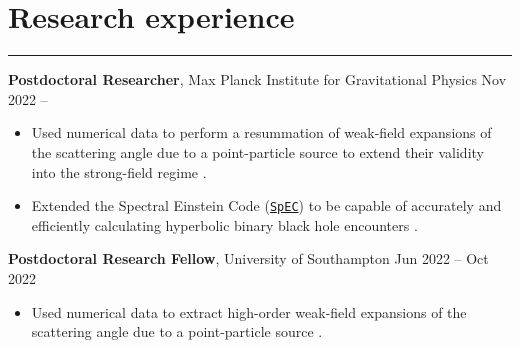 \documentclass[10.5pt, oneside]{article}   	%
\begin{document}
 
 
\begin{center}
\huge
\href{mailto:oliver.long@aei.mpg.de}{} \:
\textcolor{Orcidcolour}{\href{https://orcid.org/0000-0002-3897-9272}{}} \:
\textcolor{RGcolour}{\href{https://www.researchgate.net/profile/Oliver-Long-3}{}} \:
\textcolor{LIcolour}{\href{https://www.linkedin.com/in/oliverflong/}{}} \:
\href{https://scholar.google.com/citations?user=92pSUO0AAAAJ&hl=en}{} \:
\href{https://oliverlong.info}{}
\end{center}

 \vspace{1mm}


{\color{Sectioncolour}
\section*{Research experience}
\vspace{-3mm}
\noindent\rule{\linewidth}{0.6pt}}

\textbf{Postdoctoral Researcher}, Max Planck Institute for Gravitational Physics \hfill Nov 2022 --\\ \vspace{-5mm}
\begin{itemize}
\item Used numerical data to perform a resummation of weak-field expansions of the scattering angle due to a point-particle source to extend their validity into the strong-field regime \cite{Long:2024ltn}.
\item Extended the Spectral Einstein Code (\href{https://www.black-holes.org/for-researchers/spec}{\texttt{SpEC}}) to be capable of accurately and efficiently calculating hyperbolic binary black hole encounters \cite{NR:Prep,SXSCatalog:prep}.
\end{itemize}

\textbf{Postdoctoral Research Fellow}, University of Southampton \hfill Jun 2022 -- Oct 2022\\ 
\vspace{-5mm}
\begin{itemize}
\item Used numerical data to extract high-order weak-field expansions of the scattering angle due to a point-particle source \cite{Barack:2023oqp}.
\end{itemize}
\end{document}
